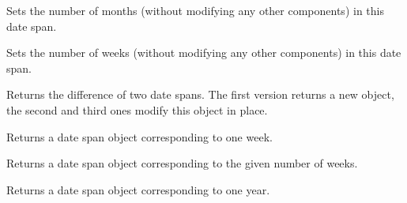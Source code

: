 
Sets the number of months (without modifying any other components) in this
date span.

\label{wxdatespansetweeks}


Sets the number of weeks (without modifying any other components) in this date
span.

\label{wxdatespansubtract}




Returns the difference of two date spans. The first version returns a new
object, the second and third ones modify this object in place.

\label{wxdatespanweek}


Returns a date span object corresponding to one week.



\label{wxdatespanweeks}


Returns a date span object corresponding to the given number of weeks.



\label{wxdatespanyear}


Returns a date span object corresponding to one year.



\label{wxdatespanyears}

